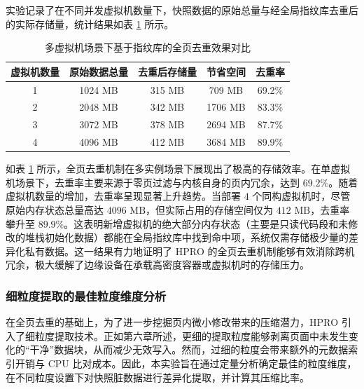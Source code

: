 实验记录了在不同并发虚拟机数量下，快照数据的原始总量与经全局指纹库去重后的实际存储量，统计结果如表 \ref{tab:deduplication} 所示。

\begin{table}[htbp]
    \centering
    \caption{多虚拟机场景下基于指纹库的全页去重效果对比}
    \label{tab:deduplication}
    \begin{tabular}{ccccc}
        \toprule
        \textbf{虚拟机数量} & \textbf{原始数据总量} & \textbf{去重后存储量} & \textbf{节省空间} & \textbf{去重率} \\
        \midrule
        1 & 1024 MB & 315 MB & 709 MB & 69.2\% \\
        2 & 2048 MB & 342 MB & 1706 MB & 83.3\% \\
        3 & 3072 MB & 378 MB & 2694 MB & 87.7\% \\
        4 & 4096 MB & 412 MB & 3684 MB & 89.9\% \\
        \bottomrule
    \end{tabular}
\end{table}


如表 \ref{tab:deduplication} 所示，全页去重机制在多实例场景下展现出了极高的存储效率。在单虚拟机场景下，去重率主要来源于零页过滤与内核自身的页内冗余，达到 $\text{69.2\%}$。随着虚拟机数量的增加，去重率呈现显著上升趋势。当部署 $\text{4}$ 个同构虚拟机时，尽管原始内存状态总量高达 $\text{4096 MB}$，但实际占用的存储空间仅为 $\text{412 MB}$，去重率攀升至 $\text{89.9\%}$。这表明新增虚拟机的绝大部分内存状态（主要是只读代码段和未修改的堆栈初始化数据）都能在全局指纹库中找到命中项，系统仅需存储极少量的差异化私有数据。这一结果有力地证明了 $\text{HPRO}$ 的全页去重机制能够有效消除跨机冗余，极大缓解了边缘设备在承载高密度容器或虚拟机时的存储压力。

\subsubsection{细粒度提取的最佳粒度维度分析}

在全页去重的基础上，为了进一步挖掘页内微小修改带来的压缩潜力，$\text{HPRO}$ 引入了细粒度提取技术。正如第六章所述，更细的提取粒度能够剥离页面中未发生变化的“干净”数据块，从而减少无效写入。然而，过细的粒度会带来额外的元数据索引开销与 $\text{CPU}$ 比对成本。因此，本实验旨在通过定量分析确定最佳的粒度维度，在不同粒度设置下对快照脏数据进行差异化提取，并计算其压缩比率。

